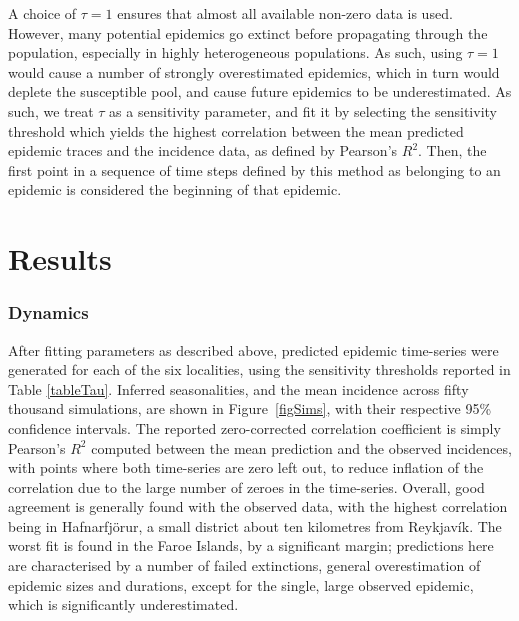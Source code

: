 \documentclass[10pt]{article}
\begin{document}
A choice of $\tau = 1$ ensures that almost all available non-zero data is used. However, many potential epidemics go extinct before propagating through the population, especially in highly heterogeneous populations. As such, using $\tau=1$ would cause a number of strongly overestimated epidemics, which in turn would deplete the susceptible pool, and cause future epidemics to be underestimated. As such, we treat $\tau$ as a sensitivity parameter, and fit it by selecting the sensitivity threshold which yields the highest correlation between the mean predicted epidemic traces and the incidence data, as defined by Pearson's $R^2$. Then, the first point in a sequence of time steps defined by this method as belonging to an epidemic is considered the beginning of that epidemic.



















\section*{Results}

\subsubsection*{Dynamics}

After fitting parameters as described above, predicted epidemic time-series were generated for each of the six localities, using the sensitivity thresholds reported in Table \ref{tableTau}. Inferred seasonalities, and the mean incidence across fifty thousand simulations, are shown in Figure~\ref{figSims}, with their respective 95\% confidence intervals. The reported zero-corrected correlation coefficient is simply Pearson's $R^2$ computed between the mean prediction and the observed incidences, with points where both time-series are zero left out, to reduce inflation of the correlation due to the large number of zeroes in the time-series. Overall, good agreement is generally found with the observed data, with the highest correlation being in Hafnarfj\"{o}r\dh{}ur, a small district about ten kilometres from Reykjav\'{i}k. The worst fit is found in the Faroe Islands, by a significant margin; predictions here are characterised by a number of failed extinctions, general overestimation of epidemic sizes and durations, except for the single, large observed epidemic, which is significantly underestimated. 
\end{document}
